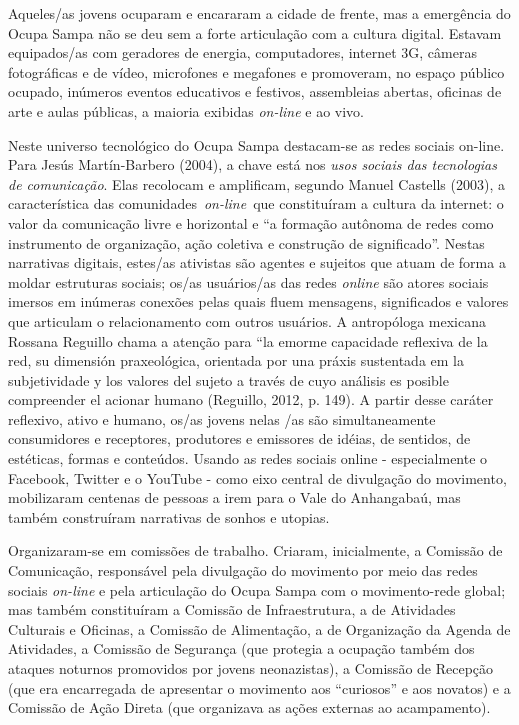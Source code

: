 Aqueles/as jovens ocuparam e encararam a cidade de frente, mas a
emergência do Ocupa Sampa não se deu sem a forte articulação com a
cultura digital. Estavam equipados/as com geradores de energia,
computadores, internet 3G, câmeras fotográficas e de vídeo, microfones e
megafones e promoveram, no espaço público ocupado, inúmeros eventos
educativos e festivos, assembleias abertas, oficinas de arte e aulas
públicas, a maioria exibidas \emph{on-line} e ao vivo.

Neste universo tecnológico do Ocupa Sampa destacam-se as redes sociais
on-line. Para Jesús Martín-Barbero (2004), a chave está nos \emph{usos
sociais das tecnologias de comunicação}. Elas recolocam e amplificam,
segundo Manuel Castells (2003), a característica das
comunidades~\emph{on-line}~que constituíram a cultura da internet: o
valor da comunicação livre e horizontal e ``a formação autônoma de redes
como instrumento de organização, ação coletiva e construção de
significado''. Nestas narrativas digitais, estes/as ativistas são
agentes e sujeitos que atuam de forma a moldar estruturas sociais; os/as
usuários/as das redes \emph{online} são atores sociais imersos em
inúmeras conexões pelas quais fluem mensagens, significados e valores
que articulam o relacionamento com outros usuários. A antropóloga
mexicana Rossana Reguillo chama a atenção para ``la emorme capacidade
reflexiva de la red, su dimensión praxeológica, orientada por una práxis
sustentada em la subjetividade y los valores del sujeto a través de cuyo
análisis es posible compreender el acionar humano (Reguillo, 2012, p.
149). A partir desse caráter reflexivo, ativo e humano, os/as jovens
nelas /as são simultaneamente consumidores e receptores, produtores e
emissores de idéias, de sentidos, de estéticas, formas e conteúdos.
Usando as redes sociais online - especialmente o Facebook, Twitter e o
YouTube - como eixo central de divulgação do movimento, mobilizaram
centenas de pessoas a irem para o Vale do Anhangabaú, mas também
construíram narrativas de sonhos e utopias.

Organizaram-se em comissões de trabalho. Criaram, inicialmente, a
Comissão de Comunicação, responsável pela divulgação do movimento por
meio das redes sociais \emph{on-line} e pela articulação do Ocupa Sampa
com o movimento-rede global; mas também constituíram a Comissão de
Infraestrutura, a de Atividades Culturais e Oficinas, a Comissão de
Alimentação, a de Organização da Agenda de Atividades, a Comissão de
Segurança (que protegia a ocupação também dos ataques noturnos
promovidos por jovens neonazistas), a Comissão de Recepção (que era
encarregada de apresentar o movimento aos ``curiosos'' e aos novatos) e
a Comissão de Ação Direta (que organizava as ações externas ao
acampamento).

